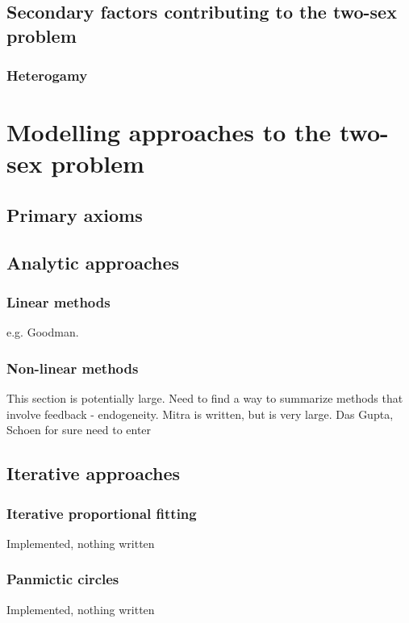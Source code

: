  \section{Secondary factors contributing to the two-sex problem}

    \subsection{Heterogamy}
      
      
\chapter{Modelling approaches to the two-sex problem}

  \section{Primary axioms}
  
  \section{Analytic approaches}
  
    \subsection{Linear methods}
     e.g. Goodman.
    
    \subsection{Non-linear methods}
     This section is potentially large. Need to find a way to summarize methods
     that involve feedback - endogeneity. Mitra is written, but is very large.
     Das Gupta, Schoen for sure need to enter
     
  \section{Iterative approaches}
  
    \subsection{Iterative proportional fitting}
     Implemented, nothing written
    
    \subsection{Panmictic circles}
     Implemented, nothing written
    
